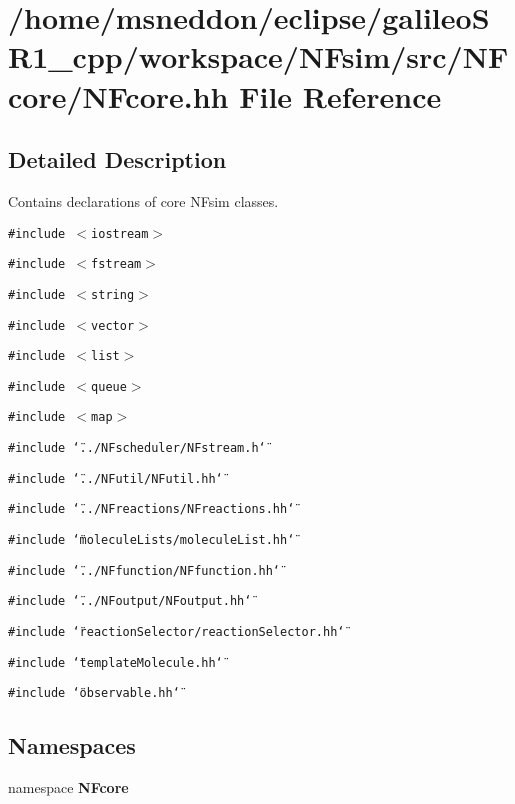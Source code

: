 \section{/home/msneddon/eclipse/galileoSR1\_\-cpp/workspace/NFsim/src/NFcore/NFcore.hh File Reference}
\label{NFcore_8hh}


\subsection{Detailed Description}
Contains declarations of core NFsim classes. 



{\tt \#include $<$iostream$>$}\par
{\tt \#include $<$fstream$>$}\par
{\tt \#include $<$string$>$}\par
{\tt \#include $<$vector$>$}\par
{\tt \#include $<$list$>$}\par
{\tt \#include $<$queue$>$}\par
{\tt \#include $<$map$>$}\par
{\tt \#include \char`\"{}../NFscheduler/NFstream.h\char`\"{}}\par
{\tt \#include \char`\"{}../NFutil/NFutil.hh\char`\"{}}\par
{\tt \#include \char`\"{}../NFreactions/NFreactions.hh\char`\"{}}\par
{\tt \#include \char`\"{}moleculeLists/moleculeList.hh\char`\"{}}\par
{\tt \#include \char`\"{}../NFfunction/NFfunction.hh\char`\"{}}\par
{\tt \#include \char`\"{}../NFoutput/NFoutput.hh\char`\"{}}\par
{\tt \#include \char`\"{}reactionSelector/reactionSelector.hh\char`\"{}}\par
{\tt \#include \char`\"{}templateMolecule.hh\char`\"{}}\par
{\tt \#include \char`\"{}observable.hh\char`\"{}}\par
\subsection*{Namespaces}
\begin{CompactItemize}
\item 
namespace {\bf NFcore}
\end{CompactItemize}
